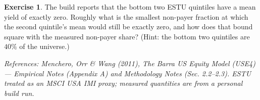 \documentclass[11pt]{article}
\theoremstyle{definition}
\newtheorem{exercise}{Exercise}[section]
\theoremstyle{plain}
\theoremstyle{remark}
\begin{document}
\begin{exercise}
The build reports that the bottom two ESTU quintiles have a mean yield of exactly zero. Roughly what is the smallest non-payer fraction at which the second quintile's mean would still be exactly zero, and how does that bound square with the measured non-payer share? (Hint: the bottom two quintiles are $40\%$ of the universe.)
\end{exercise}

\begin{center}\small\itshape
References: Menchero, Orr \& Wang (2011), \textit{The Barra US Equity Model (USE4)} --- Empirical Notes (Appendix A) and Methodology Notes (Sec. 2.2--2.3). ESTU treated as an MSCI USA IMI proxy; measured quantities are from a personal build run.
\end{center}
\end{document}
